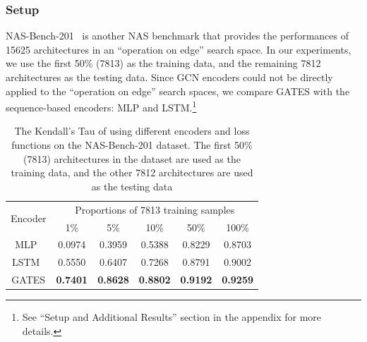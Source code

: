 \documentclass[runningheads]{llncs}
\begin{document}
\subsubsection{Setup}
NAS-Bench-201~\cite{Dong2020NAS-Bench-201} is another NAS benchmark that provides the performances of 
15625 architectures in an ``operation on edge'' search space. In our experiments, we use the first 50\% (7813) as the training data, and the remaining 7812 architectures as the testing data.
Since GCN encoders could not be directly applied to the ``operation on edge'' search spaces, we compare GATES with the sequence-based encoders: MLP and LSTM.\footnote{See ``Setup and Additional Results'' section in the appendix for more details.} 

\addtolength{\tabcolsep}{1pt}
\begin{table}[tb]
  \vspace{-5pt}
\caption{The Kendall’s Tau of using different encoders and loss functions on the NAS-Bench-201 dataset. The first 50\% (7813) architectures in the dataset are used as the training data, and the other 7812 architectures are used as the testing data}
\label{table:gates-nb201}
\begin{center}
\begin{tabular}{cccccc}
\toprule
\multirow{2}{*}{Encoder} & \multicolumn{5}{c}{Proportions of 7813 training samples}\\ 
\cmidrule(lr){2-6} & 1\% & 5\% & 10\% & 50\% & 100\% \\\midrule
MLP~\cite{wang2018alphax}   &  0.0974 & 0.3959 & 0.5388 & 0.8229 & 0.8703\\
LSTM~\cite{wang2018alphax}  & 0.5550 & 0.6407 & 0.7268 & 0.8791 & 0.9002\\
\hline
GATES & {\bf 0.7401} & {\bf 0.8628} & {\bf 0.8802} & {\bf 0.9192} & {\bf 0.9259}\\\bottomrule
\end{tabular}
\end{center}
\vspace{-5pt}
\end{table}
\addtolength{\tabcolsep}{-1pt}
\end{document}
